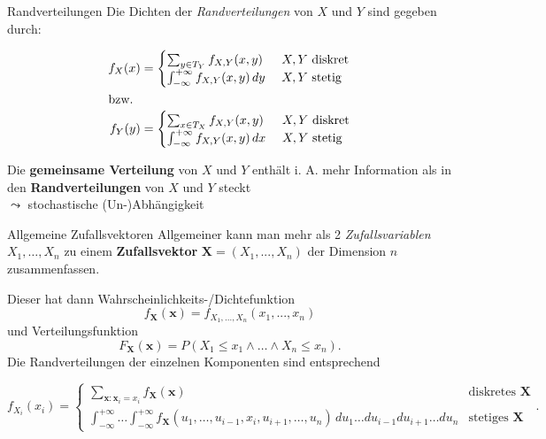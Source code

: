 \documentclass[
  10pt,
  ignorenonframetext,
]{beamer}
\begin{document}
\begin{frame}{Randverteilungen}
\protect\hypertarget{randverteilungen}{}
Die Dichten der \emph{Randverteilungen} von \(X\) und \(Y\) sind gegeben
durch:

\begin{align*}
f_X(x) &= \begin{cases} \sum_{y \in T_Y} f_{X,Y}(x,y) & \text{ $X, Y$ diskret} \\
                      \int_{-\infty}^{+\infty} f_{X,Y}(x,y)\,dy & \text{ $X, Y$ stetig} 
                      \end{cases} \\
\intertext{bzw.}
f_Y(y) &= \begin{cases} \sum_{x \in T_X} f_{X,Y}(x,y) & \text{ $X, Y$ diskret} \\
                      \int_{-\infty}^{+\infty} f_{X,Y}(x,y)\,dx & \text{ $X, Y$ stetig} 
                      \end{cases}
\end{align*}

Die \textbf{gemeinsame Verteilung} von \(X\) und \(Y\) enthält i. A.
mehr Information als in den \textbf{Randverteilungen} von \(X\) und
\(Y\) steckt\\
\(\leadsto\) stochastische (Un-)Abhängigkeit
\end{frame}

\begin{frame}{Allgemeine Zufallsvektoren}
\protect\hypertarget{allgemeine-zufallsvektoren}{}
Allgemeiner kann man mehr als 2 \emph{Zufallsvariablen}
\(X_1, \dots, X_n\) zu einem \textbf{Zufallsvektor}
\(\symbf{X}=(X_1, ..., X_n)\) der Dimension \(n\) zusammenfassen.

Dieser hat dann Wahrscheinlichkeits-/Dichtefunktion \[
f_{\symbf{X}}(\symbf{x}) = f_{X_1,..., X_n}(x_1, ..., x_n)
\] und Verteilungsfunktion \[
F_{\symbf{X}}(\symbf{x}) = P(X_1 \leq x_1 \land \dots \land X_n \leq x_n) .
\] Die Randverteilungen der einzelnen Komponenten sind entsprechend

\begin{small}
$$
f_{X_i}(x_i)  =  \begin{cases} \sum_{\symbf{x}: \symbf{x}_i = x_i} f_{\symbf{X}}(\symbf{x}) & \text{diskretes } \symbf{X} \\
 \int_{-\infty}^{+\infty}\dots\int_{-\infty}^{+\infty}f_{\symbf{X}}(u_1, \dots, u_{i-1}, x_i, u_{i+1}, \dots, u_n) \,du_1  \dots d u_{i-1} d u_{i+1} \dots du_n & \text{stetiges } \symbf{X}
 \end{cases} .
$$
\end{small}
\end{frame}
\end{document}
